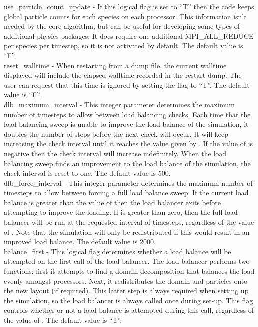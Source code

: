 {\emphtext use\_particle\_count\_update} - If this logical flag is set to
  ``T'' then the code keeps global particle counts for each species on each
  processor. This information isn't needed by the core
  algorithm, but can be useful for developing some types of additional physics
  packages. It does require one additional MPI\_ALL\_REDUCE per species per
  timestep, so it is not activated by default.
  The default value is ``F''.\\

{\emphtext reset\_walltime} - When restarting from a dump file, the current
  walltime displayed will include the elapsed walltime recorded in the
  restart dump. The user can request that this time is ignored by setting
  the  flag to ``T''.
  The default value is ``F''.\\

{\emphtext dlb\_maximum\_interval} - This integer parameter determines the
  maximum number of timesteps to allow between load balancing checks.
  Each time that the load balancing sweep is unable to improve the load
  balance of the simulation, it doubles the number of steps before the
  next check will occur. It will keep increasing the check interval until
  it reaches the value given by . If the
  value of  is negative then the check
  interval will increase
  indefinitely. When the load balancing sweep finds an improvement to the
  load balance of the simulation, the check interval is reset to one.
  The default value is 500.\\

{\emphtext dlb\_force\_interval} - This integer parameter determines the
  maximum number of timesteps
  to allow between forcing a full load balance sweep.
  If the current load balance is greater than the value of
  then the load balancer exits before attempting to improve the loading.
  If  is greater than zero, then the full load
  balancer will be run at the requested interval of timesteps, regardless
  of the value of . Note that the simulation will
  only be redistributed if this would result in an improved load balance.
  The default value is 2000.\\

{\emphtext balance\_first} - This logical flag determines whether a load balance
  will be attempted on the first call of the load balancer.
  The load balancer performs two functions: first it attempts to find a
  domain decomposition that balances the load evenly amongst processors.
  Next, it redistributes the domain and particles onto the new layout (if
  required). This latter step is always required when setting up the
  simulation, so the load balancer is always called once during set-up.
  This flag controls whether or not a load balance is attempted during
  this call, regardless of the value of .
  The default value is ``T''.\\

